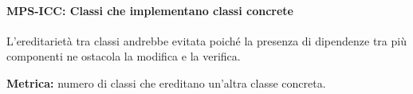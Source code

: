 \documentclass[../../norme-di-progetto.tex]{subfiles}
\begin{document}
\paragraph{MPS-ICC: Classi che implementano classi concrete}%
\label{par:MPS-ICC_classi_implementano_concrete}
L'ereditarietà tra classi andrebbe evitata poiché la presenza di dipendenze tra più componenti ne ostacola la modifica e la verifica.

\textbf{Metrica:} numero di classi che ereditano un'altra classe concreta.


\end{document}
